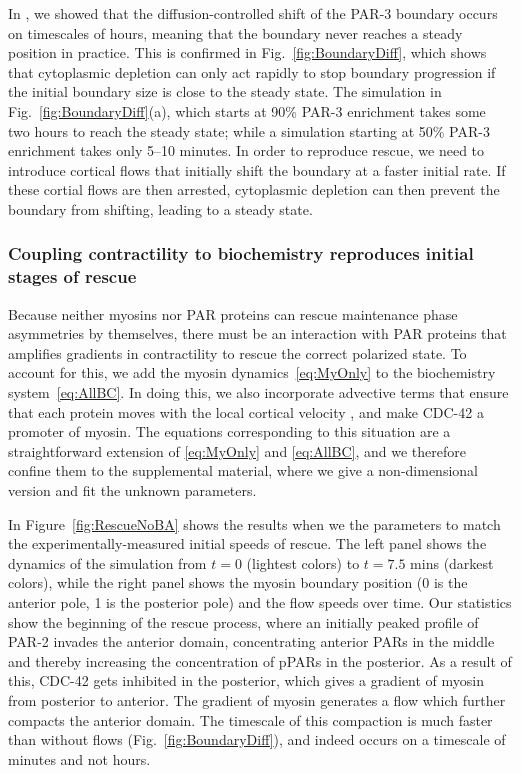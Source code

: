 \documentclass[11pt]{article}
\newcommand{\6}[1]{#1_{\text{6}}}
\newcommand{\3}[1]{#1_{\text{3}}}
\begin{document}
In \citep{lang2023oligomerization}, we showed that the diffusion-controlled shift of the PAR-3 boundary occurs on timescales of hours, meaning that the boundary never reaches a steady position in practice. This is confirmed in Fig.\ \ref{fig:BoundaryDiff}, which shows that cytoplasmic depletion can only act rapidly to stop boundary progression if the initial boundary size is close to the steady state. The simulation in Fig.\ \ref{fig:BoundaryDiff}(a), which starts at 90\% PAR-3 enrichment takes some two hours to reach the steady state; while a simulation starting at 50\% PAR-3 enrichment takes only 5--10 minutes. In order to reproduce rescue, we need to introduce cortical flows that initially shift the boundary at a faster initial rate. If these cortial flows are then arrested, cytoplasmic depletion can then prevent the boundary from shifting, leading to a steady state.


\subsubsection{Coupling contractility to biochemistry reproduces initial stages of rescue \label{sec:WithMy}}
Because neither myosins nor PAR proteins can rescue maintenance phase asymmetries by themselves, there must be an interaction with PAR proteins that amplifies gradients in contractility to rescue the correct polarized state. To account for this, we add the myosin dynamics\ \eqref{eq:MyOnly} to the biochemistry system\ \eqref{eq:AllBC}. In doing this, we also incorporate advective terms that ensure that each protein moves with the local cortical velocity \citep{illukkumbura2023design}, and make CDC-42 a promoter of myosin. The equations corresponding to this situation are a straightforward extension of \eqref{eq:MyOnly} and \eqref{eq:AllBC}, and we therefore confine them to the supplemental material, where we give a non-dimensional version and fit the unknown parameters.

In Figure\ \ref{fig:RescueNoBA} shows the results when we the parameters to match the experimentally-measured initial speeds of rescue. The left panel shows the dynamics of the simulation from $t=0$ (lightest colors) to $t=7.5$ mins (darkest colors), while the right panel shows the myosin boundary position (0 is the anterior pole, 1 is the posterior pole) and the flow speeds over time. Our statistics show the beginning of the rescue process, where an initially peaked profile of PAR-2 invades the anterior domain, concentrating anterior PARs in the middle and thereby increasing the concentration of pPARs in the posterior. As a result of this, CDC-42 gets inhibited in the posterior, which gives a gradient of myosin from posterior to anterior. The gradient of myosin generates a flow which further compacts the anterior domain. The timescale of this compaction is much faster than without flows (Fig.\ \ref{fig:BoundaryDiff}), and indeed occurs on a timescale of minutes and not hours.
\end{document}
